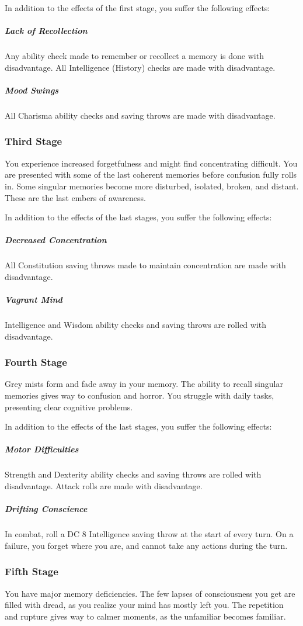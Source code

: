 In addition to the effects of the first stage, you suffer the following effects:
\subparagraph{Lack of Recollection} Any ability check made to remember or recollect a memory is done with disadvantage.
All Intelligence (History) checks are made with disadvantage.
\subparagraph{Mood Swings} All Charisma ability checks and saving throws are made with disadvantage.

\subsubsection{Third Stage}
You experience increased forgetfulness and might find concentrating difficult.
You are presented with some of the last coherent memories before confusion fully rolls in.
Some singular memories become more disturbed, isolated, broken, and distant.
These are the last embers of awareness.

In addition to the effects of the last stages, you suffer the following effects:
\subparagraph{Decreased Concentration} All Constitution saving throws made to maintain concentration are made with disadvantage.
\subparagraph{Vagrant Mind} Intelligence and Wisdom ability checks and saving throws are rolled with disadvantage.

\subsubsection{Fourth Stage}
Grey mists form and fade away in your memory.
The ability to recall singular memories gives way to confusion and horror.
You struggle with daily tasks, presenting clear cognitive problems.

In addition to the effects of the last stages, you suffer the following effects:
\subparagraph{Motor Difficulties} Strength and Dexterity ability checks and saving throws are rolled with disadvantage.
Attack rolls are made with disadvantage.
\subparagraph{Drifting Conscience} In combat, roll a DC 8 Intelligence saving throw at the start of every turn.
On a failure, you forget where you are, and cannot take any actions during the turn.

\subsubsection{Fifth Stage}
You have major memory deficiencies.
The few lapses of consciousness you get are filled with dread, as you realize your mind has mostly left you.
The repetition and rupture gives way to calmer moments, as the unfamiliar becomes familiar.

